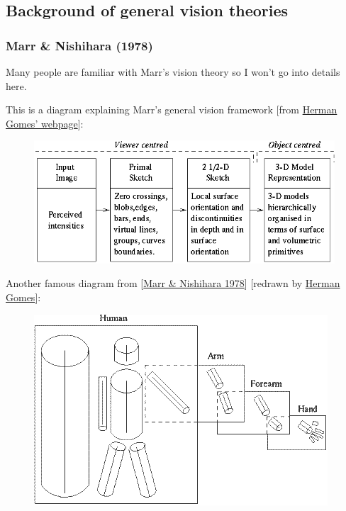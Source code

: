 \subsection{Background of general vision theories}

\subsubsection{Marr \& Nishihara (1978)}

Many people are familiar with Marr's vision theory so I won't go into details here.

This is a diagram explaining Marr's general vision framework [from \hyperlink{ref}{Herman Gomes' webpage}]:

\begin{figure}[H]
\centering
\includegraphics[scale=0.7,bb=0 0 653 267]{MarrVisionFramework.PNG}
\end{figure}

Another famous diagram from [\hyperlink{ref}{Marr \& Nishihara 1978}] [redrawn by \hyperlink{ref}{Herman Gomes}]:

\begin{figure}[H]
\centering
\includegraphics[scale=0.7,bb=0 0 414 269]{Marr3DModel.PNG}
\end{figure}

